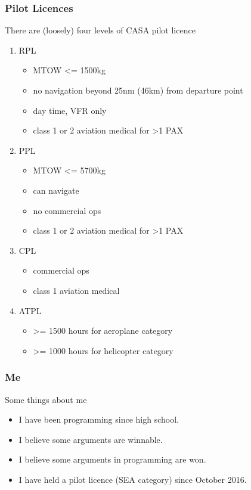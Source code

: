 \begin{frame}
\frametitle{Pilot Licences}
\begin{block}{There are (loosely) four levels of CASA pilot licence}
\begin{enumerate}
\item RPL
  \begin{itemize}
  \item \tiny{MTOW <= 1500kg}
  \item \tiny{no navigation beyond 25nm (46km) from departure point}
  \item \tiny{day time, VFR only}
  \item \tiny{class 1 or 2 aviation medical for >1 PAX}
  \end{itemize}
\item PPL
  \begin{itemize}
  \item \tiny{MTOW <= 5700kg}
  \item \tiny{can navigate}
  \item \tiny{no commercial ops}
  \item \tiny{class 1 or 2 aviation medical for >1 PAX}
  \end{itemize}
\item CPL
  \begin{itemize}
  \item \tiny{commercial ops}
  \item \tiny{class 1 aviation medical}
  \end{itemize}
\item ATPL
  \begin{itemize}
  \item \tiny{>= 1500 hours for aeroplane category}
  \item \tiny{>= 1000 hours for helicopter category}
  \end{itemize}
\end{enumerate}
\end{block}
\end{frame}

\begin{frame}
\frametitle{Me}
\begin{block}{Some things about me}
\begin{itemize}
\item I have been programming since high school.
\item I believe some arguments are winnable.
\item I believe some arguments in programming are won.
\item I have held a pilot licence (SEA category) since October 2016.
\end{itemize}
\end{block}
\end{frame}

